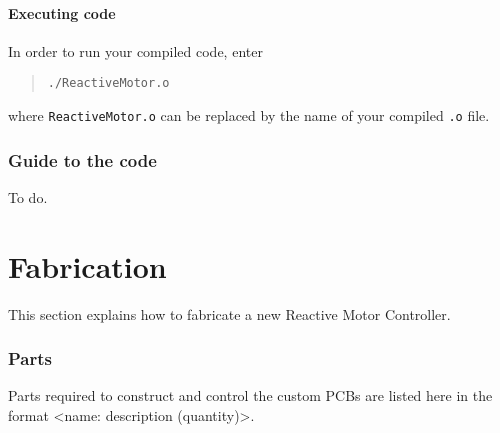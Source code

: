 \documentclass[11pt, letterpaper]{article}
\begin{document}
\subsection{Executing code}
In order to run your compiled code, enter
\begin{quote}
	\texttt{./ReactiveMotor.o}
\end{quote}
where \texttt{ReactiveMotor.o} can be replaced by the name of your compiled \texttt{.o} file.
	

\section{Guide to the code}
To do.

\newpage
\part{Fabrication}
This section explains how to fabricate a new Reactive Motor Controller.

\section{Parts}
Parts required to construct and control the custom PCBs are listed here in the format <name: description (quantity)>.
\end{document}
